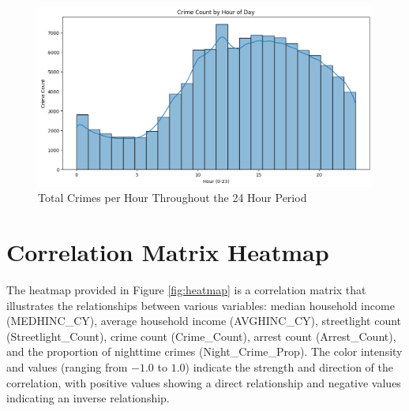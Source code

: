 \documentclass{report}
\begin{document}
\begin{figure}[ht]
  \begin{center}
    \advance\leftskip-3cm
    \advance\rightskip-3cm
    \includegraphics[keepaspectratio=true,scale=.6]{crime-by-hour}
    \caption{Total Crimes per Hour Throughout the 24 Hour Period}
    \label{fig:crime-by-hour}
  \end{center}
\end{figure}



\newpage
\section{Correlation Matrix Heatmap}
\par The heatmap provided in Figure \ref{fig:heatmap} is a correlation matrix that illustrates the relationships between various variables: median household income (MEDHINC\_CY), average household income (AVGHINC\_CY), streetlight count (Streetlight\_Count), crime count (Crime\_Count), arrest count (Arrest\_Count), and the proportion of nighttime crimes (Night\_Crime\_Prop). The color intensity and values (ranging from $-1.0$ to $1.0$) indicate the strength and direction of the correlation, with positive values showing a direct relationship and negative values indicating an inverse relationship.
\end{document}
